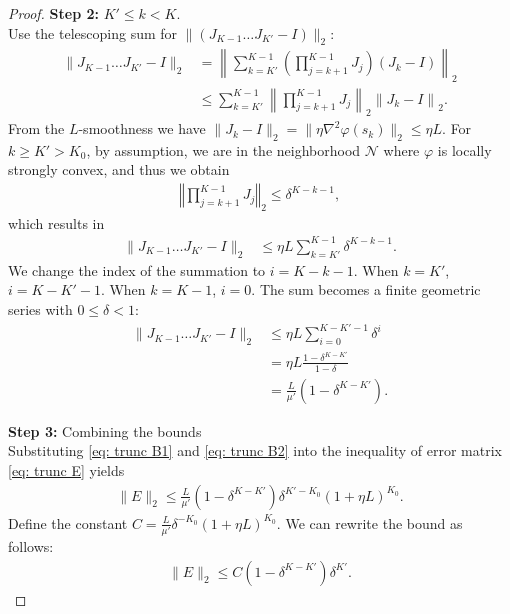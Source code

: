\documentclass[10pt,a4paper]{amsart}
\def\cN{\mathcal{N}} \def\cO{\mathcal{O}} \def\cP{\mathcal{P}}
\begin{document}
\begin{proof}
    \textbf{Step 2:} $K' \leq k < K$. \\
    Use the telescoping sum for $\| (J_{K-1} \dots J_{K'} - I) \|_2$: 
    \begin{align*}
        \| J_{K-1} \dots J_{K'} - I \|_2 &=  \left \|\sum_{k = K'}^{K-1} \left( \prod_{j=k+1}^{K-1} J_j \right) (J_k-I) \right\|_2 \\
        & \leq \sum_{k = K'}^{K-1} \left\|\prod_{j=k+1}^{K-1} J_j \right\|_2 \left\| J_k-I \right\|_2.
    \end{align*}
    From the $L$-smoothness we have $\| J_k - I \|_2 = \| \eta \nabla^2 \varphi (s_k) \|_2 \leq \eta L$. 
    For $k \geq K' > K_0$, by assumption, we are in the neighborhood $\cN$ where $\varphi$ is locally strongly convex, and thus we obtain 
    \begin{align*}
        \left\Vert \prod_{j=k+1}^{K-1} J_j \right\Vert_2 \leq \delta^{K-k-1},
    \end{align*}
    which results in 
    \begin{align*}
        \| J_{K-1} \dots J_{K'} - I \|_2 &\leq \eta L \sum_{k = K'}^{K-1} \delta^{K-k-1}.      
    \end{align*}
    We change the index of the summation to $i=K-k-1$. When $k=K'$, $i=K-K'-1$. When $k=K-1$, $i=0$. The sum becomes a finite geometric series with $0 \leq \delta < 1$:
    \begin{align}\label{eq: trunc B2}
        \| J_{K-1} \dots J_{K'} - I \|_2 &\leq \eta L \sum_{i = 0}^{K-K'-1} \delta^{i} \nonumber\\
        &= \eta L\frac{1 - \delta^{K-K'}}{1- \delta}   \nonumber\\
        &= \frac{L} {\mu'}(1 - \delta^{K-K'}).
    \end{align}

    \textbf{Step 3:} Combining the bounds  \\
    Substituting \eqref{eq: trunc B1} and \eqref{eq: trunc B2} into the inequality of error matrix \eqref{eq: trunc E} yields
    \begin{align*}
        \| E\|_2 \leq \frac{L}{\mu'}(1- \delta^{K-K'}) \delta^{K' - K_0} (1 +\eta L)^{K_0}.
    \end{align*}
    Define the constant $C = \frac{L}{\mu'} \delta^{-K_0}(1 + \eta L)^{K_0}$. We can rewrite the bound as follows:
    \begin{align*}
        \| E\|_2 \leq C (1- \delta^{K-K'})\delta^{K'}.
    \end{align*}    
\end{proof}
\end{document}
